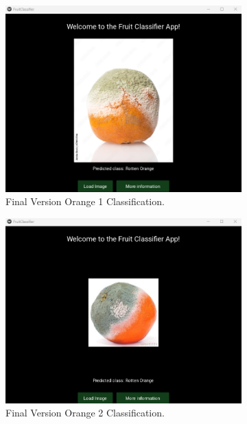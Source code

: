 \documentclass[conference]{IEEEtran}
\begin{document}
\begin{figure}[h]
\begin{subfigure}[b]{0.48\linewidth}
        \includegraphics[width=\linewidth]{Mlayer orageR1.png}
        \caption{Final Version Orange 1 Classification.}
        \label{figFA}
    \end{subfigure}
    \hfill
    \begin{subfigure}[b]{0.48\linewidth}
        \centering
        \includegraphics[width=\linewidth]{Mlayer orageR2.png}
        \caption{Final Version Orange 2 Classification.}
        \label{figFB}
    \end{subfigure}
    \hfill
    \begin{subfigure}[b]{0.48\linewidth}
        \centering

\end{subfigure}
\end{figure}
\end{document}

